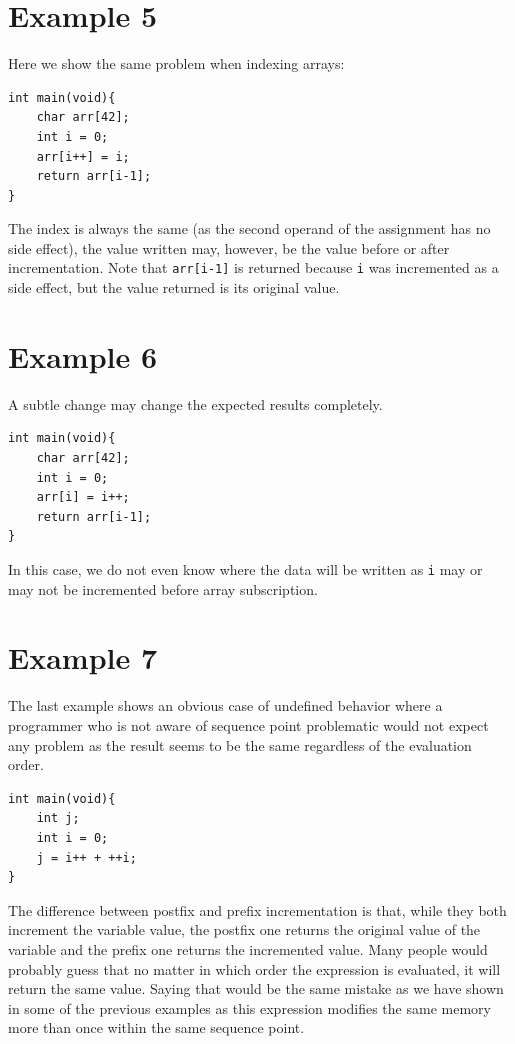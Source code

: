 \section{Example 5}\label{example5}
Here we show the same problem when indexing arrays:
\begin{lstlisting}
int main(void){
    char arr[42];
    int i = 0;
    arr[i++] = i;
    return arr[i-1];
}
\end{lstlisting}
The index is always the same (as the second operand of the assignment has no side effect), the value written may, however, be the value before or after incrementation. Note that \verb|arr[i-1]| is returned because \verb|i| was incremented as a side effect, but the value returned is its original value.

\section{Example 6}\label{example6}
A subtle change may change the expected results completely.
\begin{lstlisting}
int main(void){
    char arr[42];
    int i = 0;
    arr[i] = i++;
    return arr[i-1];
}
\end{lstlisting}
In this case, we do not even know where the data will be written as \verb|i| may or may not be incremented before array subscription.

\section{Example 7}\label{example7}
The last example shows an obvious case of undefined behavior where a programmer who is not aware of sequence point problematic would not expect any problem as the result seems to be the same regardless of the evaluation order.
\begin{lstlisting}
int main(void){
    int j;
    int i = 0;
    j = i++ + ++i;
}
\end{lstlisting}
The difference between postfix and prefix incrementation is that, while they both increment the variable value, the postfix one returns the original value of the variable and the prefix one returns the incremented value. Many people would probably guess that no matter in which order the expression is evaluated, it will return the same value. Saying that would be the same mistake as we have shown in some of the previous examples as this expression modifies the same memory more than once within the same sequence point.

